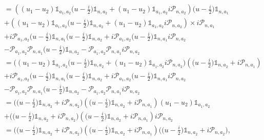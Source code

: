 \documentclass{homework}
\begin{document}
\begin{align*} \\
    &= \left({(u_1-u_2) \mathds{1}_{a_1, a_2}  \bigg(u-\frac{i}{2}\bigg) \mathds{1}_{n, a_2}} + {(u_1-u_2) \mathds{1}_{a_1, a_2} i \bm{\mathcal{P}}_{n, a_2}}\right) \bigg(u-\frac{i}{2}\bigg) \mathds{1}_{n, a_1} \\
    &+ \left({(u_1-u_2) \mathds{1}_{a_1, a_2} \bigg(u-\frac{i}{2}\bigg) \mathds{1}_{n, a_2}} + {(u_1-u_2) \mathds{1}_{a_1, a_2} i \bm{\mathcal{P}}_{n, a_2}} \right) \times  i \bm{\mathcal{P}}_{n, a_1} \\
    &+ i \bm{\mathcal{P}}_{a_1, a_2} \bigg(u-\frac{i}{2}\bigg) \mathds{1}_{n, a_1} \bigg(u-\frac{i}{2}\bigg) \mathds{1}_{n, a_2} + i \bm{\mathcal{P}}_{a_1, a_2} \bigg(u-\frac{i}{2}\bigg) \mathds{1}_{n, a_1} i \bm{\mathcal{P}}_{n, a_2} \\
    & - \bm{\mathcal{P}}_{a_1, a_2}  \bm{\mathcal{P}}_{n, a_1}  \bigg(u-\frac{i}{2}\bigg) \mathds{1}_{n, a_2} - \bm{\mathcal{P}}_{a_1, a_2}  \bm{\mathcal{P}}_{n, a_1} i \bm{\mathcal{P}}_{n, a_2} \\
    &= \bigg((u_1-u_2) \mathds{1}_{a_1, a_2} \bigg(u-\frac{i}{2}\bigg) \mathds{1}_{n, a_2} + {(u_1-u_2) \mathds{1}_{a_1, a_2} i \bm{\mathcal{P}}_{n, a_2}} \bigg) \left( \bigg(u-\frac{i}{2}\bigg) \mathds{1}_{n, a_2} + i \bm{\mathcal{P}}_{n, a_1} \right) \\
    &+ i \bm{\mathcal{P}}_{a_1, a_2} \bigg(u-\frac{i}{2}\bigg) \mathds{1}_{n, a_1} \bigg(u-\frac{i}{2}\bigg) \mathds{1}_{n, a_2} + i \bm{\mathcal{P}}_{a_1, a_2} \bigg(u-\frac{i}{2}\bigg) \mathds{1}_{n, a_1} i \bm{\mathcal{P}}_{n, a_2} \\
    & - \bm{\mathcal{P}}_{a_1, a_2}  \bm{\mathcal{P}}_{n, a_1}  \bigg(u-\frac{i}{2}\bigg) \mathds{1}_{n, a_2} - \bm{\mathcal{P}}_{a_1, a_2}  \bm{\mathcal{P}}_{n, a_1} i \bm{\mathcal{P}}_{n, a_2} \\
    &= \bigg( \bigg(u-\frac{i}{2}\bigg) \mathds{1}_{n, a_2}  + { i \bm{\mathcal{P}}_{n, a_2}} \bigg) \left( \bigg(u-\frac{i}{2}\bigg) \mathds{1}_{n, a_2} + i \bm{\mathcal{P}}_{n, a_1} \right) (u_1-u_2) \mathds{1}_{a_1, a_2}  \\
    &+ \bigg( \bigg(u-\frac{i}{2}\bigg) \mathds{1}_{n, a_2}  + { i \bm{\mathcal{P}}_{n, a_2}} \bigg) \left( \bigg(u-\frac{i}{2}\bigg) \mathds{1}_{n, a_2} + i \bm{\mathcal{P}}_{n, a_1} \right)  i \bm{\mathcal{P}}_{n, a_2}  \\
    &= \bigg( \bigg(u-\frac{i}{2}\bigg) \mathds{1}_{n, a_2}  + { i \bm{\mathcal{P}}_{n, a_2}} \bigg) \left( \bigg(u-\frac{i}{2}\bigg) \mathds{1}_{n, a_2} + i \bm{\mathcal{P}}_{n, a_1} \right) \bigg(\bigg(u-\frac{i}{2}\bigg) \mathds{1}_{n, a_2} + i \bm{\mathcal{P}}_{n, a_2} \bigg), 
\end{align*}
\end{document}
